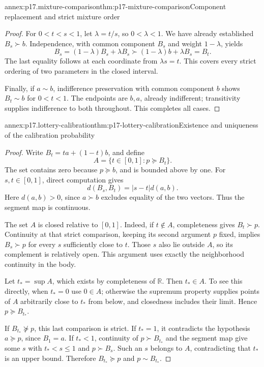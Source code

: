 \begin{annexitem}{annex:p17.mixture-comparison}{thm:p17-mixture-comparison}{Component replacement and strict mixture order}
\begin{proof}
For \(0<t<s<1\), let \(\lambda=t/s\), so \(0<\lambda<1\).
We have already established \(B_s\succ b\). Independence, with
common component \(B_s\) and weight \(1-\lambda\), yields
\[
 B_s=(1-\lambda)B_s+\lambda B_s
       \succ(1-\lambda)b+\lambda B_s=B_t.
\]
The last equality follows at each coordinate from \(\lambda s=t\).
This covers every strict ordering of two parameters in the closed interval.

Finally, if \(a\sim b\), indifference preservation with common
component \(b\) shows \(B_t\sim b\) for \(0<t<1\). The endpoints
are \(b,a\), already indifferent; transitivity supplies indifference
to both throughout. This completes all cases.
\end{proof}
\end{annexitem}

\begin{annexitem}{annex:p17.lottery-calibration}{thm:p17-lottery-calibration}{Existence and uniqueness of the calibration probability}
\begin{proof}
Write \(B_t=ta+(1-t)b\), and define
\[
                 A=\{t\in[0,1]:p\succeq B_t\}.
\]
The set contains zero because \(p\succeq b\), and is bounded above
by one. For \(s,t\in[0,1]\), direct computation gives
\[
                      d(B_s,B_t)=|s-t|d(a,b).
\]
Here \(d(a,b)>0\), since \(a\succ b\) excludes equality of the
two vectors. Thus the segment map is continuous.

The set \(A\) is closed relative to \([0,1]\). Indeed, if
\(t\notin A\), completeness gives \(B_t\succ p\). Continuity
at that strict comparison, keeping its second argument \(p\) fixed,
implies \(B_s\succ p\) for every \(s\) sufficiently close to \(t\).
Those \(s\) also lie outside \(A\), so its complement is relatively
open. This argument uses exactly the neighborhood continuity in the body.

Let \(t_* =\sup A\), which exists by completeness of \(\mathbb R\).
Then \(t_*\in A\). To see this directly, when \(t_*=0\) use
\(0\in A\); otherwise the supremum property supplies points of \(A\)
arbitrarily close to \(t_*\) from below, and closedness includes their
limit. Hence \(p\succeq B_{t_*}\).

If \(B_{t_*}\not\succeq p\), this last comparison is strict. If
\(t_*=1\), it contradicts the hypothesis \(a\succeq p\), since
\(B_1=a\). If \(t_*<1\), continuity of \(p\succ B_{t_*}\) and
the segment map give some \(s\) with \(t_*<s\leq1\) and
\(p\succ B_s\). Such an \(s\) belongs to \(A\), contradicting
that \(t_*\) is an upper bound. Therefore \(B_{t_*}\succeq p\)
and \(p\sim B_{t_*}\).


\end{proof}
\end{annexitem}
